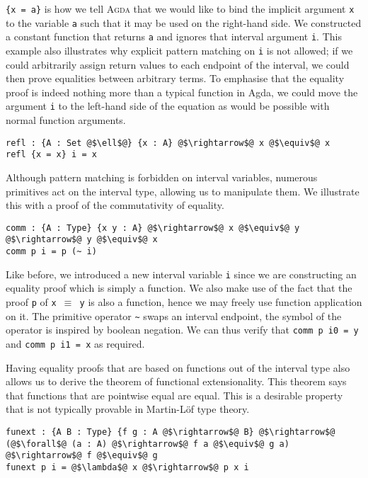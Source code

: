 \documentclass[12pt,twoside,maitrise]{dms}
\theoremstyle{definition}
\numberwithin{equation}{section}
\numberwithin{table}{chapter}
\numberwithin{figure}{chapter}
\newcommand\id[1] {\texttt{#1}}
\newcommand\fn[1] {\texttt{#1}}
\def\Agda{\textsc{Agda}\xspace}
\begin{document}
\fn{\{x = a\}} is how we tell \Agda{} that we would like to bind the implicit
argument \id{x} to the variable \id{a} such that it may be used on the
right-hand side. We constructed a constant function that returns \id{a} and
ignores that interval argument \id{i}. This example also illustrates why
explicit pattern matching on \id{i} is not allowed; if we could arbitrarily
assign return values to each endpoint of the interval, we could then prove
equalities between arbitrary terms. To emphasise that the equality proof is
indeed nothing more than a typical function in Agda, we could move the argument
\id{i} to the left-hand side of the equation as would be possible with normal
function arguments.

\begin{verbatim}
refl : {A : Set @$\ell$@} {x : A} @$\rightarrow$@ x @$\equiv$@ x
refl {x = x} i = x
\end{verbatim}

Although pattern matching is forbidden on interval variables, numerous primitives
act on the interval type, allowing us to manipulate them. We illustrate this with
a proof of the commutativity of equality.

\begin{verbatim}
comm : {A : Type} {x y : A} @$\rightarrow$@ x @$\equiv$@ y @$\rightarrow$@ y @$\equiv$@ x
comm p i = p (~ i)
\end{verbatim}

Like before, we introduced a new interval variable \id{i} since we are
constructing an equality proof which is simply a function. We also make use of
the fact that the proof \id{p} of \fn{x $\equiv$ y} is also a function, hence we
may freely use function application on it. The primitive operator \id{\~{}}
swaps an interval endpoint, the symbol of the operator is inspired by boolean
negation. We can thus verify that \fn{comm p i0 = y} and \fn{comm p i1 = x} as
required.

Having equality proofs that are based on functions out of the interval type also
allows us to derive the theorem of functional extensionality. This theorem says
that functions that are pointwise equal are equal. This is a desirable property
that is not typically provable in Martin-Löf type
theory\cite{martin1975intuitionistic}.

\begin{verbatim}
funext : {A B : Type} {f g : A @$\rightarrow$@ B} @$\rightarrow$@ (@$\forall$@ (a : A) @$\rightarrow$@ f a @$\equiv$@ g a) @$\rightarrow$@ f @$\equiv$@ g
funext p i = @$\lambda$@ x @$\rightarrow$@ p x i
\end{verbatim}
\end{document}
